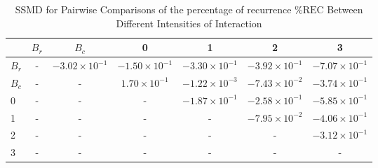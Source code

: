 \begin{table*}[!t]
\caption{SSMD for Pairwise Comparisons of the percentage of recurrence $\%\text{REC}$ Between Different Intensities of Interaction\label{tab:ssmd_rec}}
\centering
\begin{tabular}{lcccccc}
\toprule
 & $B_r$ & $B_c$ & 0 & 1 & 2 & 3 \\
\midrule
$B_r$ & - & $-3.02 \times 10^{-1}$ & $-1.50 \times 10^{-1}$ & $-3.30 \times 10^{-1}$ & $-3.92 \times 10^{-1}$ & $-7.07 \times 10^{-1}$ \\
$B_c$ & - & - & $1.70 \times 10^{-1}$ & $-1.22 \times 10^{-3}$ & $-7.43 \times 10^{-2}$ & $-3.74 \times 10^{-1}$ \\
0 & - & - & - & $-1.87 \times 10^{-1}$ & $-2.58 \times 10^{-1}$ & $-5.85 \times 10^{-1}$ \\
1 & - & - & - & - & $-7.95 \times 10^{-2}$ & $-4.06 \times 10^{-1}$ \\
2 & - & - & - & - & - & $-3.12 \times 10^{-1}$ \\
3 & - & - & - & - & - & - \\
\bottomrule
\end{tabular}
\end{table*}
